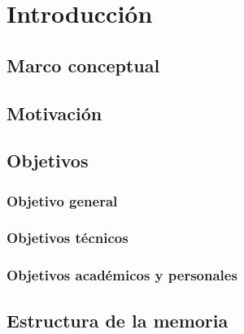 
\chapter{Introducción}\label{cap:introduccion}

\section{Marco conceptual}\label{sec:marco-conceptual}


\section{Motivación}\label{sec:motivacion}


\section{Objetivos}\label{sec:objetivos}

\subsection{Objetivo general}\label{sec:objetivo-general}


\subsection{Objetivos técnicos}\label{sec:objetivos-tecnicos}


\subsection{Objetivos académicos y personales}\label{sec:objetivos-academicos}


\section{Estructura de la memoria}\label{sec:estructura-memoria}

